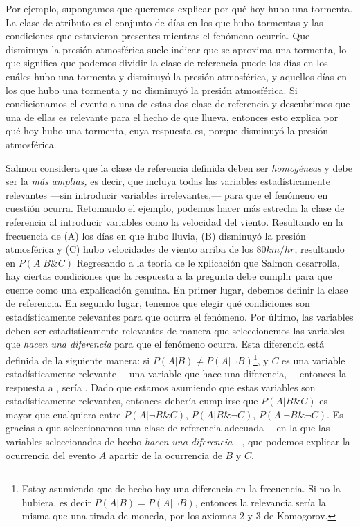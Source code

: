 Por ejemplo, supongamos que queremos explicar por qué hoy hubo una
tormenta. La clase de atributo es el conjunto de días en los que hubo
tormentas y las condiciones que estuvieron presentes mientras el
fenómeno ocurría. Que disminuya la presión atmosférica suele indicar
que se aproxima una tormenta, lo que significa que podemos dividir la
clase de referencia puede los días en los cuáles hubo una tormenta y
disminuyó la presión atmosférica, y aquellos días en los que hubo una
tormenta y no disminuyó la presión atmosférica. Si condicionamos el
evento a una de estas dos clase de referencia y descubrimos que una
de ellas es relevante para el hecho de que llueva, entonces esto
explica por qué hoy hubo una tormenta, cuya respuesta es, porque
disminuyó la presión atmosférica.

Salmon considera que la clase de referencia definida deben ser \emph
{homogéneas} y debe ser la \emph{más amplias,} es decir, que incluya
todas las variables estadísticamente relevantes ---sin introducir
variables irrelevantes,--- para que el fenómeno en cuestión ocurra.
Retomando el ejemplo, podemos hacer más estrecha la clase de
referencia al introducir variables como la velocidad del viento.
Resultando en la frecuencia de (A) los días en que hubo lluvia, (B)
disminuyó la presión atmosférica y (C) hubo velocidades de viento
arriba de los $80 km/hr$, resultando en $P(A|B \&C)$ Regresando a la
teoría de le xplicación que Salmon desarrolla, hay ciertas
condiciones que la respuesta a la pregunta  debe cumplir para que cuente como una expalicación genuina. En
primer lugar, debemos definir la clase de referencia. En segundo
lugar, tenemos que elegir qué condiciones son estadísticamente
relevantes para que ocurra el fenómeno. Por último, las variables
deben ser estadísticamente relevantes de manera que seleccionemos las
variables que \emph{hacen una diferencia} para que el fenómeno
ocurra. Esta diferencia está definida de la siguiente manera: si
$P(A|B) \neq P(A|\neg{B})$\footnote{ Estoy asumiendo que de hecho hay
 una diferencia en la frecuencia. Si no la hubiera, es decir $P(A|B) =
  P(A|\neg{B})$, entonces la relevancia sería la misma que una tirada
 de moneda, por los axiomas 2 y 3 de Komogorov. }, y $C$ es una
variable estadísticamente relevante ---una variable que hace una
diferencia,--- entonces la respuesta a , sería . Dado que estamos asumiendo que estas
variables son estadísticamente relevantes, entonces debería cumplirse
que $P(A|B \& C )$ es mayor que cualquiera entre $P(A|\neg{B} \& C)$,
$P(A|B \& \neg{C})$, $P(A|\neg{B} \& \neg{C})$. Es gracias a que
seleccionamos una clase de referencia adecuada ---en la que las
variables seleccionadas de hecho \emph {hacen una diferencia}---, que
podemos explicar la ocurrencia del evento $A$ apartir de la
ocurrencia de $B$ y $C$.

